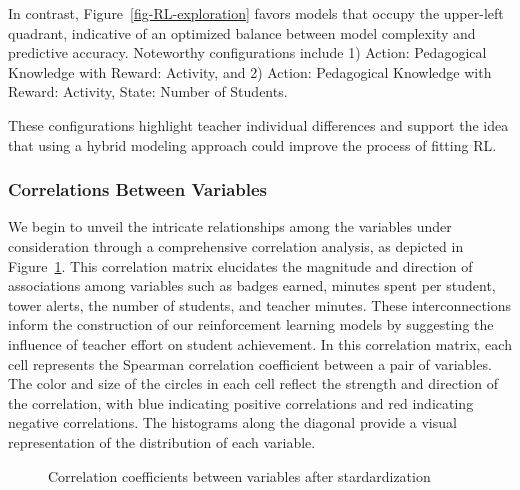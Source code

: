 \documentclass[
  number,
  preprint,
  3p,
  onecolumn]{elsarticle}
\begin{document}
In contrast, Figure~\ref{fig-RL-exploration} favors models that occupy
the upper-left quadrant, indicative of an optimized balance between
model complexity and predictive accuracy. Noteworthy configurations
include 1) Action: Pedagogical Knowledge with Reward: Activity, and 2)
Action: Pedagogical Knowledge with Reward: Activity, State: Number of
Students.

These configurations highlight teacher individual differences and
support the idea that using a hybrid modeling approach could improve the
process of fitting RL.

\subsubsection{Correlations Between
Variables}\label{correlations-between-variables}

We begin to unveil the intricate relationships among the variables under
consideration through a comprehensive correlation analysis, as depicted
in Figure~\ref{fig-corr}. This correlation matrix elucidates the
magnitude and direction of associations among variables such as badges
earned, minutes spent per student, tower alerts, the number of students,
and teacher minutes. These interconnections inform the construction of
our reinforcement learning models by suggesting the influence of teacher
effort on student achievement. In this correlation matrix, each cell
represents the Spearman correlation coefficient between a pair of
variables. The color and size of the circles in each cell reflect the
strength and direction of the correlation, with blue indicating positive
correlations and red indicating negative correlations. The histograms
along the diagonal provide a visual representation of the distribution
of each variable.

\begin{figure}


\caption{\label{fig-corr}Correlation coefficients between variables
after stardardization}

\end{figure}%
\end{document}
